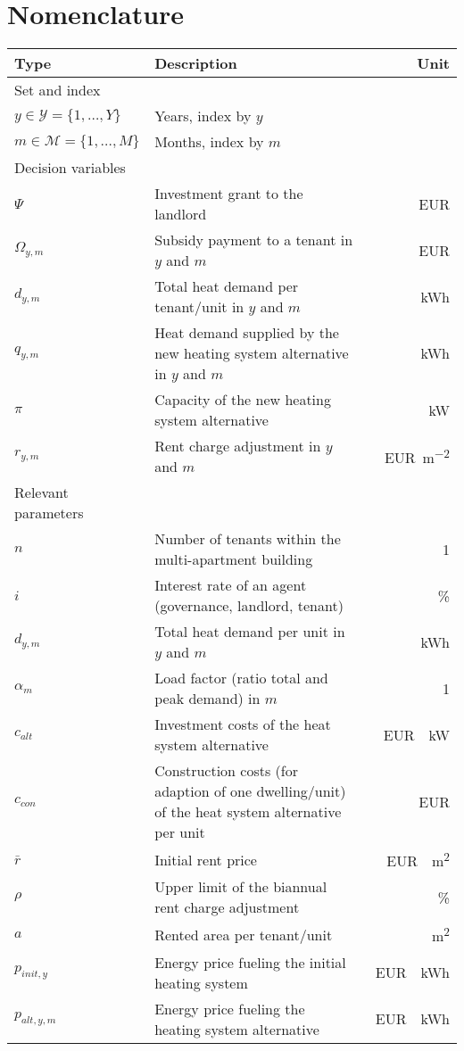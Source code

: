 \documentclass[review]{elsarticle}
\begin{document}
\section*{Nomenclature}
\begin{center}
	\renewcommand{\arraystretch}{1.1}
	\centering
	\small
	\begin{tabular}{lm{8cm}r}
		Type & Description & Unit\\
		\hline
		Set and index & & \\
		\hline
		
		{$y \in \mathcal{Y}=\{1,\ldots,Y\}$} & Years, index by $y$\\
		{$m \in \mathcal{M}=\{1,\ldots,M\}$} & Months, index by $m$\\
		\hline
		Decision variables\\
		\hline
		{$\Psi$} & Investment grant to the landlord & \SI{}{EUR}\\
		{$\Omega_{y,m}$} & Subsidy payment to a tenant in $y$ and $m$ & \SI{}{EUR}\\
		{$d_{y,m}$} & Total heat demand per tenant/unit in $y$ and $m$& \SI{}{kWh}\\
		{$q_{y,m}$} & Heat demand supplied by the new heating system alternative in $y$ and $m$& \SI{}{kWh}\\
		{$\pi$} & Capacity of the new heating system alternative & \SI{}{kW}\\
		{$r_{y,m}$} & Rent charge adjustment in $y$ and $m$ & \SI{}{EUR\per m^2}\\
		\hline
		Relevant parameters\\
		\hline
		{$n$} & Number of tenants within the multi-apartment building & \SI{}{1}\\
		{$i$} & Interest rate of an agent (governance, landlord, tenant)& \SI{}{\%}\\
		{$d_{y,m}$} & Total heat demand per unit in $y$ and $m$ & \SI{}{kWh}\\
		{$\alpha_{m}$} & Load factor (ratio total and peak demand) in $m$ & \SI{}{1}\\
		{$c_{alt}$} & Investment costs of the heat system alternative& \SI{}{EUR \per kW}\\
		{$c_{con}$} & Construction costs (for adaption of one dwelling/unit) of the heat system alternative per unit & \SI{}{EUR}\\
		{$\bar{r}$} & Initial rent price & \SI{}{EUR \per m^2}\\
		{$\rho$} & Upper limit of the biannual rent charge adjustment & \SI{}{\%}\\
		{$a$} & Rented area per tenant/unit & \SI{}{m^2}\\
		{$p_{init,y}$} & Energy price fueling the initial heating system & \SI{}{EUR \per kWh}\\
		{$p_{alt,y,m}$} & Energy price fueling the heating system alternative & \SI{}{EUR \per kWh}\\
		\hline
	\end{tabular}
\end{center}
\newpage
\end{document}
